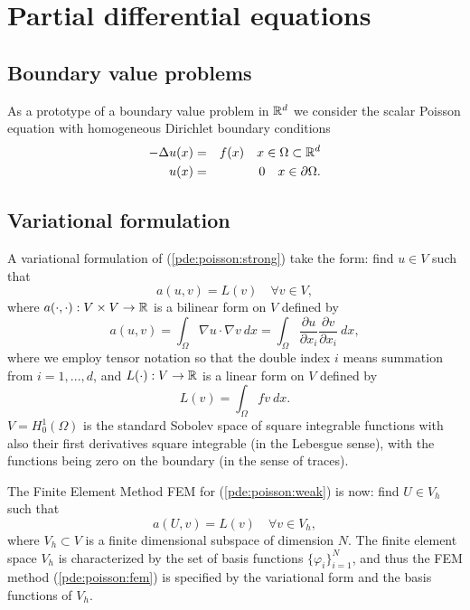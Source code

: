 \chapter{Partial differential equations}


\section{Boundary value problems}

As a prototype of a boundary value problem in $\Bbb{R}^d$ we consider the 
scalar Poisson equation with homogeneous Dirichlet boundary conditions 
\begin{eqnarray}
-\Delta u(x)&=&f(x) \quad x\in \Omega \subset \Bbb{R}^d \label{pde:poisson:strong} \\
u(x)&=&0 \quad x\in \partial \Omega. \nonumber  
\end{eqnarray}

\section{Variational formulation}

A variational formulation of (\ref{pde:poisson:strong}) take the form: 
find $u\in V$ such that  
\begin{equation}\label{pde:poisson:weak}
a(u,v)=L(v) \quad \forall v\in V, 
\end{equation}
where $a(\cdot,\cdot):V\times V\rightarrow \Bbb{R}$ is a bilinear form 
on $V$ defined by 
\begin{equation}
a(u,v)=\int_{\Omega} \nabla u \cdot \nabla v ~dx 
=\int_{\Omega} \frac{\partial u}{\partial x_i} \frac{\partial v}{\partial x_i} ~ dx,  
\end{equation}
where we employ tensor notation so that the double index $i$ means summation from $i=1,...,d$, 
and $L(\cdot):V\rightarrow \Bbb{R}$ is a linear form on $V$ defined by 
\begin{equation}
L(v)=\int_{\Omega} f v ~dx.  
\end{equation}
$V=H^1_0(\Omega)$ is the standard Sobolev space of square integrable 
functions with also their first derivatives square integrable (in the Lebesgue sense), 
with the functions being zero on the boundary (in the sense of traces).   

The Finite Element Method FEM for (\ref{pde:poisson:weak}) is now: 
find $U\in V_h$ such that  
\begin{equation}\label{pde:poisson:fem}
a(U,v)=L(v) \quad \forall v\in V_h, 
\end{equation}
where $V_h\subset V$ is a finite dimensional subspace of dimension $N$. 
The finite element space $V_h$ is characterized by the set of basis 
functions $\{\varphi_i\}_{i=1}^N$, and thus the FEM method 
(\ref{pde:poisson:fem}) is specified by the variational form and 
the basis functions of $V_h$. 

